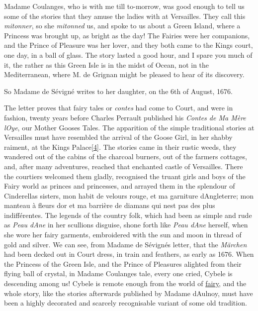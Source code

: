 \documentclass[14pt,a4paper]{memoir}
\newcommand{\ul}[1]{\uline{#1}}
\begin{document}
\textquotesingle Madame Coulanges, who is with me till to-morrow, was
good enough to tell us some of the stories that they amuse the ladies
with at Versailles. They call this \emph{mitonner}, so she
\emph{mitonned} us, and spoke to us about a Green Island, where a
Princess was brought up, as bright as the day! The Fairies were her
companions, and the Prince of Pleasure was her lover, and they both came
to the King\textquotesingle s court, one day, in a ball of glass. The
story lasted a good hour, and I spare you much of it, the rather as this
Green Isle is in the midst of Ocean, not in the Mediterranean, where M.
de Grignan might be pleased to hear of its discovery.\textquotesingle{}

So Madame de Sévigné writes to her daughter, on the 6th of August, 1676.

The letter proves that fairy tales or \emph{contes} had come to Court,
and were in fashion, twenty years before Charles Perrault published his
\emph{Contes de Ma Mère l\textquotesingle Oye}, our
\textquotesingle Mother Goose\textquotesingle s Tales.\textquotesingle{}
The apparition of the simple traditional stories at Versailles must have
resembled the arrival of the Goose Girl, in her shabby raiment, at the
King\textquotesingle s
Palace\protect\hypertarget{4533318093929944247_33931-h-0.htm.xhtmlux5cux23FNanchor_4}{}{}\protect\hyperlink{4533318093929944247_33931-h-0.htm.xhtmlux5cux23Footnote_4}{{{[}4{]}}}.
The stories came in their rustic weeds, they wandered out of the cabins
of the charcoal burners, out of the farmers\textquotesingle{} cottages,
and, after many adventures, reached that enchanted castle of Versailles.
There the courtiers welcomed them gladly, recognised the truant girls
and boys of the Fairy world as princes and princesses, and arrayed them
in the splendour of Cinderella\textquotesingle s sisters,
\textquotesingle mon habit de velours rouge, et ma garniture
d\textquotesingle Angleterre; mon manteau à fleurs d\textquotesingle or
et ma barrière de diamans qui n\textquotesingle est pas des plus
indifférentes.\textquotesingle{} The legends of the country folk, which
had been as simple and rude as \emph{Peau d\textquotesingle Ane} in her
scullion\textquotesingle s disguise, shone forth like \emph{Peau
d\textquotesingle Ane} herself, when she wore her fairy garments,
embroidered with the sun and moon in thread of gold and silver. We can
see, from Madame de Sévigné\textquotesingle s letter, that the
\emph{Märchen} had been decked out in Court dress, in train and
feathers, as early as 1676. When the Princess of the Green Isle, and the
Prince of Pleasures alighted from their flying ball of crystal, in
Madame Coulanges\textquotesingle{} tale, every one cried,
\textquotesingle Cybele is descending among us!\textquotesingle{} Cybele
is remote enough from the world of \ul{fairy}, and the whole story, like
the stories afterwards published by Madame d\textquotesingle Aulnoy,
must have been a highly decorated and scarcely recognisable variant of
some old tradition.
\end{document}
